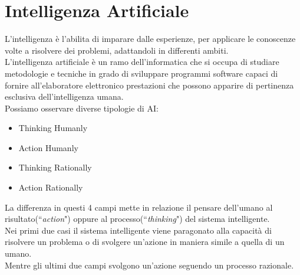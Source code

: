 \documentclass[../tesi.tex]{subfiles}
\begin{document}
\section{Intelligenza Artificiale}
L’intelligenza è l’abilita di imparare dalle esperienze, per applicare le conoscenze volte a risolvere dei problemi, adattandoli in differenti ambiti.\\
L’intelligenza artificiale è un ramo dell’informatica che si occupa di studiare metodologie e tecniche in grado di sviluppare programmi software capaci di fornire all’elaboratore elettronico prestazioni che possono apparire di pertinenza esclusiva dell’intelligenza umana.\\
Possiamo osservare diverse tipologie di AI:
\begin{itemize}
  \item Thinking Humanly
  \item Action Humanly
  \item Thinking Rationally
  \item Action Rationally
\end{itemize}
La differenza in questi 4 campi mette in relazione il pensare dell’umano al risultato(``\textit{action}") oppure al processo(``\textit{thinking}") del sistema intelligente.\\
Nei primi due casi il sistema intelligente viene paragonato alla capacità di risolvere un problema o di svolgere un’azione in maniera simile a quella di un umano.\\
Mentre gli ultimi due campi svolgono un’azione seguendo un processo razionale.
\end{document}
